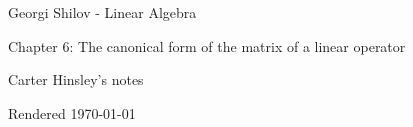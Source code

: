 \documentclass[a4paper]{article}
\begin{document}
\begin{center}
\LARGE{Georgi Shilov - Linear Algebra}

\Large{Chapter 6: The canonical form of the matrix of a linear operator}

\large{Carter Hinsley's notes}

Rendered \today
\end{center}
\end{document}
